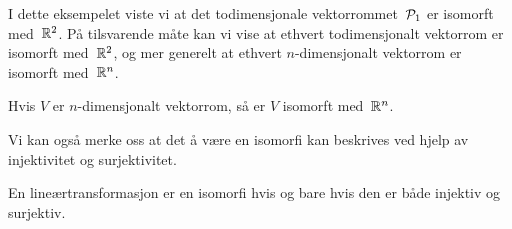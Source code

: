 I dette eksempelet viste vi at det todimensjonale vektorrommet~$\P_1$
er isomorft med~$\R^2$.  På tilsvarende måte kan vi vise at ethvert
todimensjonalt vektorrom er isomorft med~$\R^2$, og mer generelt at
ethvert $n$-dimensjonalt vektorrom er isomorft med~$\R^n$.

\begin{thm}
Hvis $V$ er $n$-dimensjonalt vektorrom, så er $V$ isomorft med~$\R^n$.
\end{thm}

Vi kan også merke oss at det å være en isomorfi kan beskrives ved
hjelp av injektivitet og surjektivitet.

\begin{thm}
En lineærtransformasjon er en isomorfi hvis og bare hvis den er både
injektiv og surjektiv.
\end{thm}

\kapittelslutt
